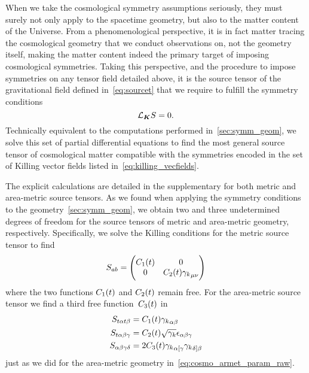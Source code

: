 When we take the cosmological symmetry assumptions seriously, they must surely not only apply to the spacetime geometry, but also to the matter content of the Universe. From a phenomenological perspective, it is in fact matter tracing the cosmological geometry that we conduct observations on, not the geometry itself, making the matter content indeed the primary target of imposing cosmological symmetries. Taking this perspective, and the procedure to impose symmetries on any tensor field detailed above, it is the source tensor of the gravitational field defined in~\eqref{eq:sourcet} that we require to fulfill the symmetry conditions
\begin{equation}\label{eq:killing_cond_sourcet}
	\mathcal{L}_{\boldsymbol{K}} S=0
	\mathpunct{.}
\end{equation}
Technically equivalent to the computations performed in~\autoref{sec:symm_geom}, we solve this set of partial differential equations to find the most general source tensor of cosmological matter compatible with the symmetries encoded in the set of \FLRW{} Killing vector fields listed in~\eqref{eq:killing_vecfields}.


The explicit calculations are detailed in the supplementary  for both metric and area-metric source tensors. As we found when applying the symmetry conditions to the geometry~\autoref{sec:symm_geom}, we obtain two and three undetermined degrees of freedom for the source tensors of metric and area-metric geometry, respectively. Specifically, we solve the Killing conditions for the metric source tensor to find
\begin{equation}\label{eq:cosmo_fluid_met_raw}
	S_{ab}=\begin{pmatrix}
		C_1(t) & 0\\
		0 & C_2(t){\gamma_{k}}_{\mu\nu}
	\end{pmatrix}
\end{equation}
where the two functions $C_1(t)$ and $C_2(t)$ remain free. For the area-metric source tensor we find a third free function~$C_3(t)$ in
\begin{align}\label{eq:cosmo_fluid_armet_raw}
	\begin{split}
		S_{t\alpha t\beta}&=C_1(t){\gamma_{k}}_{\alpha\beta}\\
		S_{t\alpha\beta\gamma}&=C_2(t)\sqrt{{\gamma_{k}}}\epsilon_{\alpha\beta\gamma}\\
		S_{\alpha\beta\gamma\delta}&=2C_3(t){\gamma_{k}}_{\alpha[\gamma}{\gamma_{k}}_{\delta]\beta}
	\end{split}
\end{align}
just as we did for the area-metric geometry in~\eqref{eq:cosmo_armet_param_raw}.

